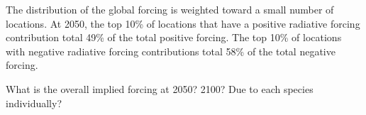 The distribution of the global forcing is weighted toward a small number of locations. At 2050, the top 10\% of locations that have a positive radiative forcing contribution total 49\% of the total positive forcing. The top 10\% of locations with negative radiative forcing contributions total 58\% of the total negative forcing.

What is the overall implied forcing at 2050? 2100? Due to each species individually?
